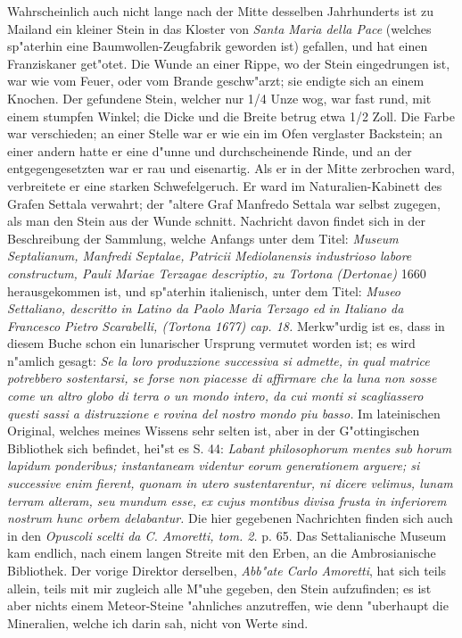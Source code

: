 \documentclass[a4paper, 11pt, oneside, polutonikogreek, german]{article}
\begin{document}
Wahrscheinlich auch nicht lange nach der Mitte desselben Jahrhunderts ist zu Mailand ein kleiner Stein in das Kloster von \emph{Santa Maria della Pace} (welches sp"aterhin eine Baumwollen-Zeugfabrik geworden ist) gefallen, und hat einen Franziskaner get"otet. Die Wunde an einer Rippe, wo der Stein eingedrungen ist, war wie vom Feuer, oder vom Brande geschw"arzt; sie endigte sich an einem Knochen. Der gefundene Stein, welcher nur 1/4 Unze wog, war fast rund, mit einem stumpfen Winkel; die Dicke und die Breite betrug etwa 1/2 Zoll. Die Farbe war verschieden; an einer Stelle war er wie ein im Ofen verglaster Backstein; an einer andern hatte er eine d"unne und durchscheinende Rinde, und an der entgegengesetzten war er rau und eisenartig. Als er in der Mitte zerbrochen ward, verbreitete er eine starken Schwefelgeruch. Er ward im Naturalien-Kabinett des Grafen Settala verwahrt; der "altere Graf Manfredo Settala war selbst zugegen, als man den Stein aus der Wunde schnitt. Nachricht davon findet sich in der Beschreibung der Sammlung, welche Anfangs unter dem Titel: \emph{Museum Septalianum, Manfredi Septalae, Patricii Mediolanensis industrioso labore constructum, Pauli Mariae Terzagae descriptio, zu Tortona (Dertonae)} 1660 herausgekommen ist, und sp"aterhin italienisch, unter dem Titel: \emph{Museo Settaliano, descritto in Latino da Paolo Maria Terzago ed in Italiano da Francesco Pietro Scarabelli, (Tortona 1677) cap. 18.} Merkw"urdig ist es, dass in diesem Buche schon ein lunarischer Ursprung vermutet worden ist; es wird n"amlich gesagt: \emph{Se la loro produzzione successiva si admette, in qual matrice potrebbero sostentarsi, se forse non piacesse di affirmare che la luna non sosse come un altro globo di terra o un mondo intero, da cui monti si scagliassero questi sassi a distruzzione e rovina del nostro mondo piu basso.} Im lateinischen Original, welches meines Wissens sehr selten ist, aber in der G"ottingischen Bibliothek sich befindet, hei"st es S. 44: \emph{Labant philosophorum mentes sub horum lapidum ponderibus; instantaneam videntur eorum generationem arguere; si successive enim fierent, quonam in utero sustentarentur, ni dicere velimus, lunam terram alteram, seu mundum esse, ex cujus montibus divisa frusta in inferiorem nostrum hunc orbem delabantur.} Die hier gegebenen Nachrichten finden sich auch in den \emph{Opuscoli scelti da C. Amoretti, tom. 2.} p. 65. Das Settalianische Museum kam endlich, nach einem langen Streite mit den Erben, an die Ambrosianische Bibliothek. Der vorige Direktor derselben, \emph{Abb"ate Carlo Amoretti}, hat sich teils allein, teils mit mir zugleich alle M"uhe gegeben, den Stein aufzufinden; es ist aber nichts einem Meteor-Steine "ahnliches anzutreffen, wie denn "uberhaupt die Mineralien, welche ich darin sah, nicht von Werte sind.
\end{document}
